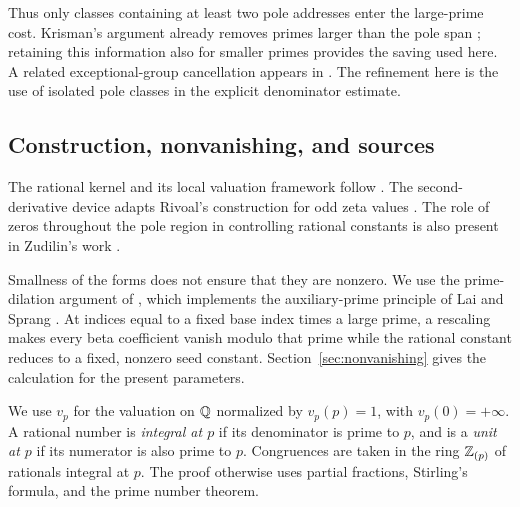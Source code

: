 Thus only classes containing at least two pole addresses enter the
large-prime cost. Krisman's argument already removes primes larger
than the pole span \cite[Section 4.3]{krisman}; retaining this information
also for smaller primes provides the saving used here. A related
exceptional-group cancellation appears in
\cite[Section 3.2]{finite}. The refinement here is the use of isolated
pole classes in the explicit denominator estimate.

\subsection{Construction, nonvanishing, and sources}
The rational kernel and its local valuation framework follow
\cite[Sections 2--6]{krisman}. The second-derivative device adapts
Rivoal's construction for odd zeta values \cite[Section 2]{rivoal}.
The role of zeros throughout the pole region in controlling rational
constants is also present in Zudilin's work
\cite[proof of Lemma 1]{zudilin}.

Smallness of the forms does not ensure that they are nonzero.
We use the prime-dilation argument of \cite[Section 4]{powered},
which implements the auxiliary-prime principle of Lai and Sprang
\cite[Lemma 2.3]{laisprang}. At indices equal to a fixed base index
times a large prime, a rescaling makes every beta coefficient vanish
modulo that prime while the rational constant reduces to a fixed,
nonzero seed constant. Section~\ref{sec:nonvanishing} gives the
calculation for the present parameters.

We use $v_p$ for the valuation on $\mathbb Q$ normalized by $v_p(p)=1$,
with $v_p(0)=+\infty$. A rational number is \emph{integral at $p$}
if its denominator is prime to $p$, and is a \emph{unit at $p$} if
its numerator is also prime to $p$. Congruences are taken in the ring
$\mathbb Z_{(p)}$ of rationals integral at $p$. The proof otherwise uses
partial fractions, Stirling's formula, and the prime number theorem.
